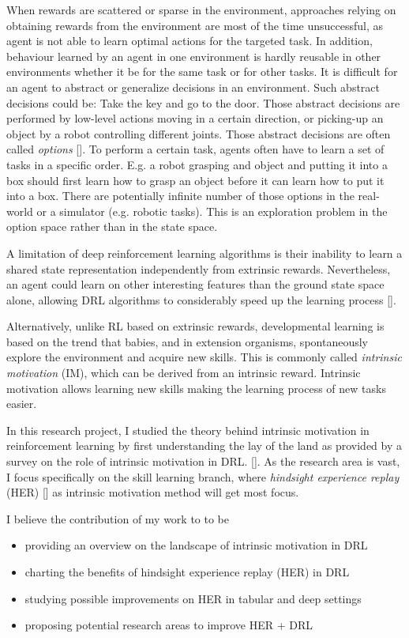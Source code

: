 \documentclass[conference]{IEEEtran}
\begin{document}
When rewards are scattered or sparse in the environment, approaches relying on obtaining rewards from the environment are most of the time unsuccessful, as agent is not able to learn optimal actions for the targeted task. In addition, behaviour learned by an agent in one environment is hardly reusable in other environments whether it be for the same task or for other tasks. It is difficult for an agent to abstract or generalize decisions in an environment. Such abstract decisions could be: Take the key and go to the door. Those abstract decisions are performed by low-level actions moving in a certain direction, or picking-up an object by a robot controlling different joints. Those abstract decisions are often called \textit{options} [\cite{sutton1999between}]. To perform a certain task, agents often have to learn a set of tasks in a specific order. E.g. a robot grasping and object and putting it into a box should first learn how to grasp an object before it can learn how to put it into a box. There are potentially infinite number of those options in the real-world or a simulator (e.g. robotic tasks). This is an exploration problem in the option space rather than in the state space.

A limitation of deep reinforcement learning algorithms is their inability to learn a shared state representation independently from extrinsic rewards. Nevertheless, an agent could learn on other interesting features than the ground state space alone, allowing DRL algorithms to considerably speed up the learning process [\cite{raffin2019decoupling}].

Alternatively, unlike RL based on extrinsic rewards, developmental learning is based on the trend that babies, and in extension organisms, spontaneously explore the environment and acquire new skills. This is commonly called \textit{intrinsic motivation} (IM), which can be derived from an intrinsic reward. Intrinsic motivation allows learning new skills making the learning process of new tasks easier.

In this research project, I studied the theory behind intrinsic motivation in reinforcement learning by first understanding the lay of the land as provided by a survey on the role of intrinsic motivation in DRL. [\cite{aubret2019survey}]. As the research area is vast, I focus specifically on the skill learning branch, where \textit{hindsight experience replay} (HER) [\cite{andrychowicz2017hindsight}] as intrinsic motivation method will get most focus.

I believe the contribution of my work to to be
\begin{itemize}
    \item providing an overview on the landscape of intrinsic motivation in DRL
    \item charting the benefits of hindsight experience replay (HER) in DRL
    \item studying possible improvements on HER in tabular and deep settings
    \item proposing potential research areas to improve HER + DRL
\end{itemize}{}
\end{document}
